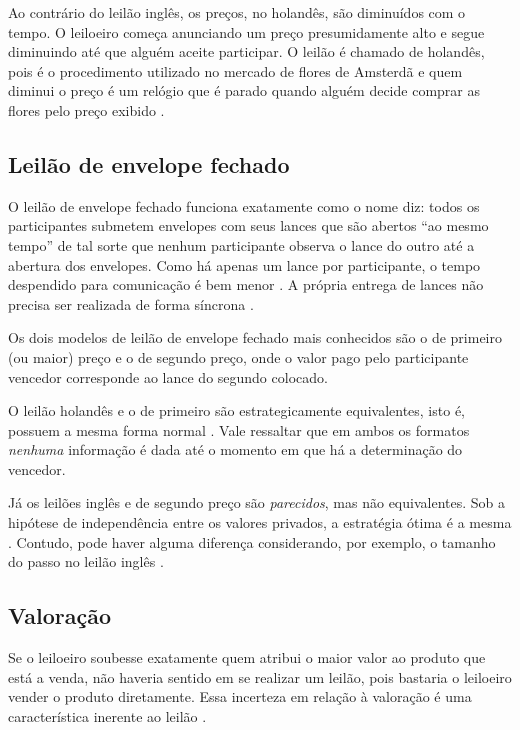 Ao contrário do leilão inglês, os preços, no holandês, são diminuídos com o tempo. O leiloeiro começa anunciando um preço presumidamente alto e segue diminuindo até que alguém aceite participar. O leilão é chamado de holandês, pois é o procedimento utilizado no mercado de flores de Amsterdã e quem diminui o preço é um relógio que é parado quando alguém decide comprar as flores pelo preço exibido \citet{Shoham2008}.

\subsection{Leilão de envelope fechado}

O leilão de envelope fechado funciona exatamente como o nome diz: todos os participantes submetem envelopes com seus lances que são abertos ``ao mesmo tempo'' de tal sorte que nenhum participante observa o lance do outro até a abertura dos envelopes. Como há apenas um lance por participante, o tempo despendido para comunicação é bem menor \citet{karlin2017game}. A própria entrega de lances não precisa ser realizada de forma síncrona \citet{krishna}.

Os dois modelos de leilão de envelope fechado mais conhecidos são o de primeiro (ou maior) preço e o de segundo preço, onde o valor pago pelo participante vencedor corresponde ao lance do segundo colocado.

O leilão holandês e o de primeiro são estrategicamente equivalentes, isto é, possuem a mesma forma normal \citet{krishna}. Vale ressaltar que em ambos os formatos \emph{nenhuma} informação é dada até o momento em que há a determinação do vencedor.

Já os leilões inglês e de segundo preço são \emph{parecidos}, mas não equivalentes. Sob a hipótese de independência entre os valores privados, a estratégia ótima é a mesma \citet{krishna}. Contudo, pode haver alguma diferença considerando, por exemplo, o tamanho do passo no leilão inglês \citet{Shoham2008}.

\subsection{Valoração}

Se o leiloeiro soubesse exatamente quem atribui o maior valor ao produto que está a venda, não haveria sentido em se realizar um leilão, pois bastaria o leiloeiro vender o produto diretamente. Essa incerteza em relação à valoração é uma característica inerente ao leilão \citet{krishna}.

